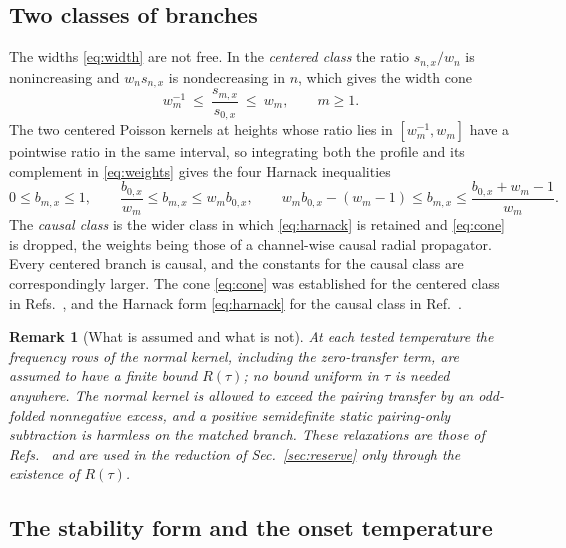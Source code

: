 \documentclass[aps,10pt,superscriptaddress,floatfix,amsmath,amssymb,nofootinbib]{revtex4-2}
\newtheorem{remark}{Remark}
\begin{document}
\subsection{Two classes of branches}

The widths \eqref{eq:width} are not free. In the \emph{centered class} the ratio
$s_{n,x}/w_n$ is nonincreasing and $w_ns_{n,x}$ is nondecreasing in $n$, which gives the
width cone
\begin{equation}\label{eq:cone}
w_m^{-1}\ \le\ \frac{s_{m,x}}{s_{0,x}}\ \le\ w_m,\qquad m\ge1.
\end{equation}
The two centered Poisson kernels at heights whose ratio lies in $[w_m^{-1},w_m]$ have a
pointwise ratio in the same interval, so integrating both the profile and its complement
in \eqref{eq:weights} gives the four Harnack inequalities
\begin{equation}\label{eq:harnack}
0\le b_{m,x}\le1,\qquad
\frac{b_{0,x}}{w_m}\le b_{m,x}\le w_mb_{0,x},\qquad
w_mb_{0,x}-(w_m-1)\le b_{m,x}\le\frac{b_{0,x}+w_m-1}{w_m}.
\end{equation}
The \emph{causal class} is the wider class in which \eqref{eq:harnack} is retained and
\eqref{eq:cone} is dropped, the weights being those of a channel-wise causal radial
propagator. Every centered branch is causal, and the constants for the causal class are
correspondingly larger. The cone \eqref{eq:cone} was established for the centered class in
Refs.~\cite{univglue,optimum}, and the Harnack form \eqref{eq:harnack} for the causal class
in Ref.~\cite{finiteenergy}.

\begin{remark}[What is assumed and what is not]\label{rem:assume}
At each tested temperature the frequency rows of the normal kernel, including the
zero-transfer term, are assumed to have a finite bound $R(\tau)$; no bound uniform in
$\tau$ is needed anywhere. The normal kernel is allowed to exceed the pairing transfer by
an odd-folded nonnegative excess, and a positive semidefinite static pairing-only
subtraction is harmless on the matched branch. These relaxations are those of
Refs.~\cite{optimum,anisosharp} and are used in the reduction of
Sec.~\ref{sec:reserve} only through the existence of $R(\tau)$.
\end{remark}

\subsection{The stability form and the onset temperature}
\end{document}
